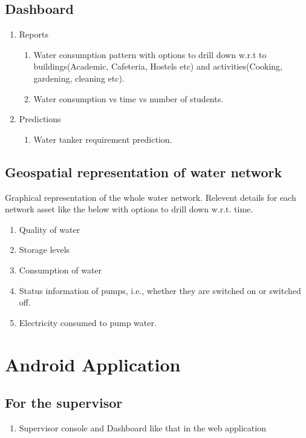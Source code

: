\documentclass[paper=a4, fontsize=11pt]{scrartcl} %
\numberwithin{equation}{section} %
\numberwithin{figure}{section} %
\numberwithin{table}{section} %
\begin{document}
\subsection{ Dashboard }
\begin{enumerate}
\item
Reports
\begin{enumerate}
\item
Water consumption pattern with options to drill down w.r.t to buildings(Academic, Cafeteria, Hostels etc) and activities(Cooking, gardening, cleaning etc).
\item
Water consumption vs time vs number of students.
\end{enumerate}
\item
Predictions
\begin{enumerate}
\item
Water tanker requirement prediction.
\end{enumerate}
\end{enumerate}

\subsection{Geospatial representation of water network}
Graphical representation of the whole water network. Relevent details for each network asset like the below with options to drill down w.r.t. time.
\begin{enumerate}
\item
Quality of water
\item
Storage levels
\item
Consumption of water
\item
Status information of pumps, i.e., whether they are switched on or switched off.
\item
Electricity consumed to pump water.
\end{enumerate}



\section{Android Application}
\subsection{For the supervisor}
\begin{enumerate}
\item
Supervisor console and Dashboard like that in the web application
\end{enumerate}
\end{document}
